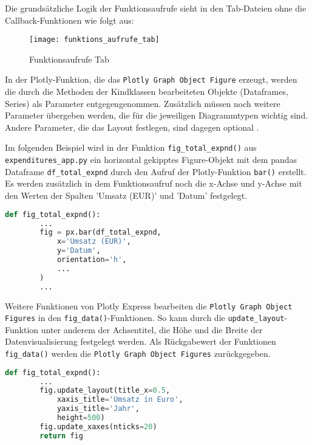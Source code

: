     Die grundsätzliche Logik der Funktionsaufrufe sieht in den Tab-Dateien ohne die Callback-Funktionen wie folgt aus:


    \begin{figure}[H]
        \centering
            \texttt{[image: funktions\_aufrufe\_tab]}
            \caption{Funktionsaufrufe Tab}
            \label{fig:function call tab}
    \end{figure}

    In der Plotly-Funktion, die das \texttt{Plotly Graph Object Figure} erzeugt, werden die durch die Methoden der Kindklassen bearbeiteten Objekte (Dataframes, Series) 
    als Parameter entgegengenommen. Zusätzlich müssen noch weitere Parameter übergeben werden, die für die jeweiligen Diagrammtypen wichtig sind.
    Andere Parameter, die das Layout festlegen, sind dagegen optional \cite[vgl.][]{plotly_plotlygraph_objectsbar_2021}.
    
    Im folgenden Beispiel wird in der Funktion \texttt{fig\_total\_expnd()} aus \texttt{expenditures\_app.py} ein horizontal gekipptes Figure-Objekt
    mit dem pandas Dataframe \texttt{df\_total\_expnd} durch den Aufruf der Plotly-Funktion \texttt{bar()} erstellt. 
    Es werden zusätzlich in dem Funktionsaufruf noch die x-Achse und y-Achse mit den Werten der Spalten 'Umsatz (EUR)' und 'Datum' festgelegt. 

    \begin{lstlisting}[language=Python, caption=Funktion fig\_total\_expnd() Auszug 1]
    def fig_total_expnd():
        ...
        fig = px.bar(df_total_expnd,
            x='Umsatz (EUR)',
            y='Datum',
            orientation='h',
            ...
        )
        ...
    \end{lstlisting}
    
    Weitere Funktionen von Plotly Express bearbeiten die \texttt{Plotly Graph Object Figures} in den \texttt{fig\_data()}-Funktionen. 
    So kann durch die \texttt{update\_layout}-Funktion unter anderem der Achsentitel, die Höhe und die Breite der Datenvisualisierung 
    festgelegt werden. Als Rückgabewert der Funktionen \texttt{fig\_data()} werden die \texttt{Plotly Graph Object Figures} zurückgegeben.

    \begin{lstlisting}[language=Python, caption=fig\_total\_expnd() Auszug 2]  
    def fig_total_expnd():
        ...
        fig.update_layout(title_x=0.5,
            xaxis_title='Umsatz in Euro',
            yaxis_title='Jahr',
            height=500)
        fig.update_xaxes(nticks=20)         
        return fig
    \end{lstlisting}

